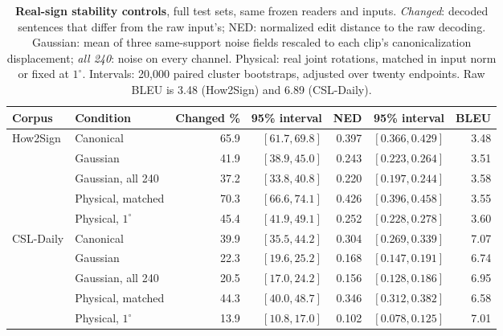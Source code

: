 \begin{table}[t]
\centering\footnotesize
\caption{\textbf{Real-sign stability controls}, full test sets, same frozen readers and inputs. \emph{Changed}: decoded sentences that differ from the raw input's; NED: normalized edit distance to the raw decoding. Gaussian: mean of three same-support noise fields rescaled to each clip's canonicalization displacement; \emph{all 240}: noise on every channel. Physical: real joint rotations, matched in input norm or fixed at $1^\circ$. Intervals: 20,000 paired cluster bootstraps, adjusted over twenty endpoints. Raw BLEU is 3.48 (How2Sign) and 6.89 (CSL-Daily).}\label{tab:signstability}
\begin{tabular}{@{}llrrrrr@{}}\toprule
Corpus&Condition&Changed \%&95\% interval&NED&95\% interval&BLEU\\\midrule
How2Sign&Canonical&65.9&$[61.7,69.8]$&0.397&$[0.366,0.429]$&3.48\\
&Gaussian&41.9&$[38.9,45.0]$&0.243&$[0.223,0.264]$&3.51\\
&Gaussian, all 240&37.2&$[33.8,40.8]$&0.220&$[0.197,0.244]$&3.58\\
&Physical, matched&70.3&$[66.6,74.1]$&0.426&$[0.396,0.458]$&3.55\\
&Physical, $1^\circ$&45.4&$[41.9,49.1]$&0.252&$[0.228,0.278]$&3.60\\\midrule
CSL-Daily&Canonical&39.9&$[35.5,44.2]$&0.304&$[0.269,0.339]$&7.07\\
&Gaussian&22.3&$[19.6,25.2]$&0.168&$[0.147,0.191]$&6.74\\
&Gaussian, all 240&20.5&$[17.0,24.2]$&0.156&$[0.128,0.186]$&6.95\\
&Physical, matched&44.3&$[40.0,48.7]$&0.346&$[0.312,0.382]$&6.58\\
&Physical, $1^\circ$&13.9&$[10.8,17.0]$&0.102&$[0.078,0.125]$&7.01\\
\bottomrule\end{tabular}\end{table}
